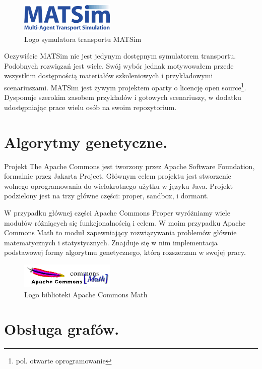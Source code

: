 \documentclass[twoside,12pt]{report}
\begin{document}
\begin{figure}[ht]
\centering
\includegraphics[width=0.40\textwidth]{img/matsim}
\caption{Logo symulatora transportu MATSim \cite{matsim}} 
\end{figure}

Oczywiście MATSim nie jest jedynym dostępnym symulatorem transportu. Podobnych rozwiązań jest wiele. Swój wybór jednak motywowałem przede wszystkim dostępnością materiałów szkoleniowych i przykładowymi scenariuszami. MATSim jest żywym projektem oparty o licencję open source\footnote{pol. otwarte oprogramowanie}. Dysponuje szerokim zasobem przykładów i gotowych scenariuszy, w dodatku udostępniając prace wielu osób na swoim repozytorium.

\section{Algorytmy genetyczne.}

Projekt The Apache Commons jest tworzony przez Apache Software Foundation, formalnie przez Jakarta Project. Głównym celem projektu jest stworzenie wolnego oprogramowania do wielokrotnego użytku w języku Java. Projekt podzielony jest na trzy główne części: proper, sandbox, i dormant.

W przypadku głównej części Apache Commons Proper wyróżniamy wiele modułów różniących się funkcjonalnością i celem. W moim przypadku Apache Commons Math to moduł zapewniający rozwiązywania problemów głównie matematycznych i statystycznych. Znajduje się w nim implementacja podstawowej formy algorytmu genetycznego, którą rozszerzam w swojej pracy.

\begin{figure}[ht]
\centering
\includegraphics[width=0.40\textwidth]{img/math}
\caption{Logo biblioteki Apache Commons Math \cite{math}} 
\end{figure}

\section{Obsługa grafów.}
\end{document}
